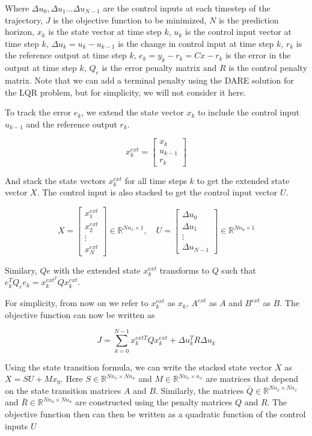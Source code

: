 \documentclass{article}
\begin{document}
Where $\Delta u_0, \Delta u_1 ... \Delta u_{N-1}$ are the control inputs at each timestep of the trajectory,
$J$ is the objective function to be minimized, $N$ is the prediction horizon, $x_k$ is the state vector at time step $k$,
$u_k$ is the control input vector at time step $k$, $\Delta u_k = u_k - u_{k-1}$ is the change in control input at time step $k$,
$r_k$ is the reference output at time step $k$, $e_k = y_k - r_k = Cx - r_k$ is the error in the output at time step $k$,
$Q_e$ is the error penalty matrix and $R$ is the control penalty matrix.
Note that we can add a terminal penalty using the DARE solution for the LQR problem, but for simplicity, we will not consider it here.

To track the error $e_k$, we extend the state vector $x_k$ to include the control input $u_{k-1}$ and the reference output $r_k$.

$$
x_k^{ext} =
\begin{bmatrix}
  x_k \\
  u_{k-1} \\
  r_k
\end{bmatrix}
$$

And stack the state vectors $x_k^{ext}$ for all time steps $k$ to get the extended state vector $X$.
The control input is also stacked to get the control input vector $U$.

$$
X =
\begin{bmatrix}
  x_1^{ext} \\
  x_2^{ext} \\
  \vdots \\
  x_N^{ext}
\end{bmatrix}  \in \mathbb{R}^{Nn_x \times 1}, \quad
U =
\begin{bmatrix}
  \Delta u_0 \\
  \Delta u_1 \\
  \vdots \\
  \Delta u_{N-1}
\end{bmatrix}  \in \mathbb{R}^{Nn_u \times 1}
$$

Similary, $Qe$ with the extended state $x_k^{ext}$ transforms to $Q$ such that $e_k^T Q_e e_k = x_k^{ext^T} Q x_k^{ext}$.

For simplicity, from now on we refer to $x_k^{ext}$ as $x_k$, $A^{ext}$ as $A$ and $B^{ext}$ as $B$.
The objective function can now be written as

$$
J = \sum_{k=0}^{N-1} x_k^{extT} Q x^{ext}_k + \Delta u_k^T R \Delta u_k
$$

Using the state transition formula, we can write the stacked state vector $X$ as $X = SU + Mx_0$.
Here $S \in \mathbb{R}^{Nn_x \times Nn_u}$ and $M \in \mathbb{R}^{Nn_x \times n_x}$ are matrices that depend on the
state transition matrices $A$ and $B$.
Similarly, the matrices $\bar{Q} \in \mathbb{R}^{Nn_x \times Nn_x}$ and $\bar{R} \in \mathbb{R}^{Nn_u \times Nn_u}$
are constructed using the penalty matrices $Q$ and $R$. The objective function then can then be written as a quadratic function of the control inputs $U$
\end{document}
